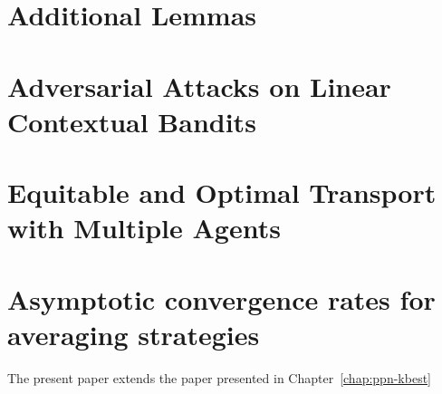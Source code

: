 \begin{appendices}
\chapter{Additional Lemmas}


\chapter{Adversarial Attacks on Linear Contextual Bandits}



\chapter{Equitable and Optimal Transport with Multiple Agents}


\chapter{Asymptotic convergence rates for averaging strategies}
The present paper extends the paper presented in Chapter~\ref{chap:ppn-kbest}

\end{appendices}
